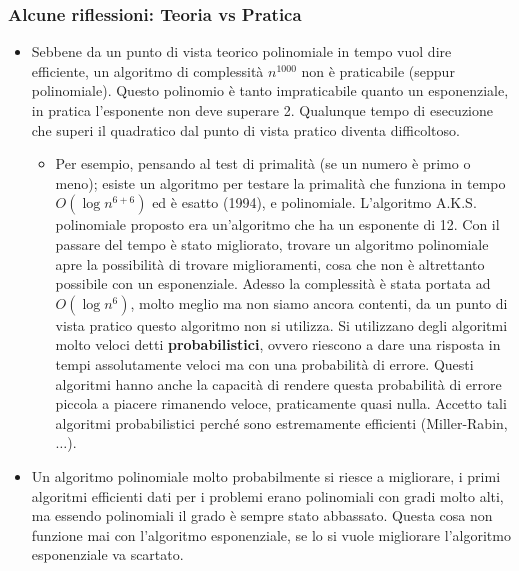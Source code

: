 \documentclass{article}
\begin{document}
\subsubsection{Alcune riflessioni: Teoria vs Pratica}
\begin{itemize}
    \item Sebbene da un punto di vista teorico polinomiale in tempo vuol dire efficiente,
          un algoritmo di complessità $n^{1000}$ non è praticabile (seppur polinomiale).
          Questo polinomio è tanto impraticabile quanto un esponenziale, in pratica l'esponente non
          deve superare 2. Qualunque tempo di esecuzione che superi il quadratico dal punto
          di vista pratico diventa difficoltoso.
          \begin{itemize}
              \item Per esempio, pensando al test di primalità (se un numero è primo o meno); esiste
                    un algoritmo per testare la primalità che funziona in tempo $O(\log n^{6+6})$ ed
                    è esatto (1994), e polinomiale. L'algoritmo A.K.S. polinomiale proposto era un'algoritmo
                    che ha un esponente di 12. Con il passare del tempo è stato migliorato, trovare un
                    algoritmo polinomiale apre la possibilità di trovare miglioramenti, cosa che non è
                    altrettanto possibile con un esponenziale. Adesso la complessità è stata portata
                    ad $O(\log n^6)$, molto meglio ma non siamo ancora contenti, da un punto di vista
                    pratico questo algoritmo non si utilizza. Si utilizzano degli algoritmi molto veloci detti
                    \textbf{probabilistici}, ovvero riescono a dare una risposta in tempi assolutamente veloci ma con una
                    probabilità di errore. Questi algoritmi hanno anche la capacità di rendere questa probabilità
                    di errore piccola a piacere rimanendo veloce, praticamente quasi nulla. Accetto tali algoritmi
                    probabilistici perché sono estremamente efficienti (Miller-Rabin, $\dots$).
          \end{itemize}

    \item  Un algoritmo polinomiale molto probabilmente si riesce a migliorare, i primi algoritmi
          efficienti dati per i problemi erano polinomiali con gradi molto alti, ma essendo polinomiali
          il grado è sempre stato abbassato. Questa cosa non funzione mai con l'algoritmo esponenziale,
          se lo si vuole migliorare l'algoritmo esponenziale va scartato.


\end{itemize}
\end{document}
